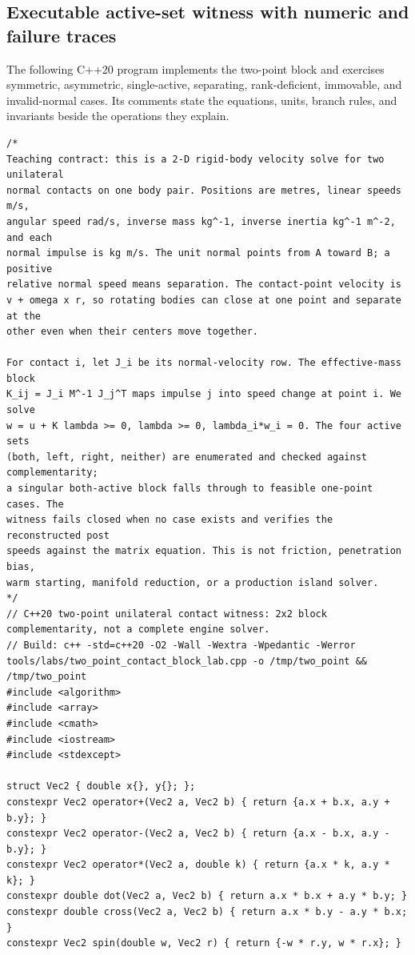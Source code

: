 \subsection{Executable active-set witness with numeric and failure traces}\label{06-engine-ii-ch040-executable-active-set-witness-with-numeric-and-failure-traces}

The following C++20 program implements the two-point block and exercises symmetric, asymmetric, single-active, separating, rank-deficient, immovable, and invalid-normal cases. Its comments state the equations, units, branch rules, and invariants beside the operations they explain.

\begin{verbatim}
/*
Teaching contract: this is a 2-D rigid-body velocity solve for two unilateral
normal contacts on one body pair. Positions are metres, linear speeds m/s,
angular speed rad/s, inverse mass kg^-1, inverse inertia kg^-1 m^-2, and each
normal impulse is kg m/s. The unit normal points from A toward B; a positive
relative normal speed means separation. The contact-point velocity is
v + omega x r, so rotating bodies can close at one point and separate at the
other even when their centers move together.

For contact i, let J_i be its normal-velocity row. The effective-mass block
K_ij = J_i M^-1 J_j^T maps impulse j into speed change at point i. We solve
w = u + K lambda >= 0, lambda >= 0, lambda_i*w_i = 0. The four active sets
(both, left, right, neither) are enumerated and checked against complementarity;
a singular both-active block falls through to feasible one-point cases. The
witness fails closed when no case exists and verifies the reconstructed post
speeds against the matrix equation. This is not friction, penetration bias,
warm starting, manifold reduction, or a production island solver.
*/
// C++20 two-point unilateral contact witness: 2x2 block complementarity, not a complete engine solver.
// Build: c++ -std=c++20 -O2 -Wall -Wextra -Wpedantic -Werror tools/labs/two_point_contact_block_lab.cpp -o /tmp/two_point && /tmp/two_point
#include <algorithm>
#include <array>
#include <cmath>
#include <iostream>
#include <stdexcept>

struct Vec2 { double x{}, y{}; };
constexpr Vec2 operator+(Vec2 a, Vec2 b) { return {a.x + b.x, a.y + b.y}; }
constexpr Vec2 operator-(Vec2 a, Vec2 b) { return {a.x - b.x, a.y - b.y}; }
constexpr Vec2 operator*(Vec2 a, double k) { return {a.x * k, a.y * k}; }
constexpr double dot(Vec2 a, Vec2 b) { return a.x * b.x + a.y * b.y; }
constexpr double cross(Vec2 a, Vec2 b) { return a.x * b.y - a.y * b.x; }
constexpr Vec2 spin(double w, Vec2 r) { return {-w * r.y, w * r.x}; }


\end{verbatim}
